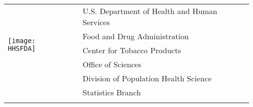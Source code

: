 \documentclass[A4,12pt]{article}%
\begin{document}

\vspace{-25pt}%
\begin{tabular}
	[t]{lp{1.1in}l}%
	\multirow{5}{*}{\texttt{[image: HHSFDA]}} 
																								&  & U.S. Department of Health and Human Services\\
																								&  & Food and Drug Administration\\
																								&  & Center for Tobacco Products\\
																								&  & Office of Sciences\\
																								&  & Division of Population Health Science\\
																								&  & Statistics Branch\\
																								&  &
\end{tabular}

\newline\vspace{15pt} \newline\vspace{0.015in}
\end{document}
